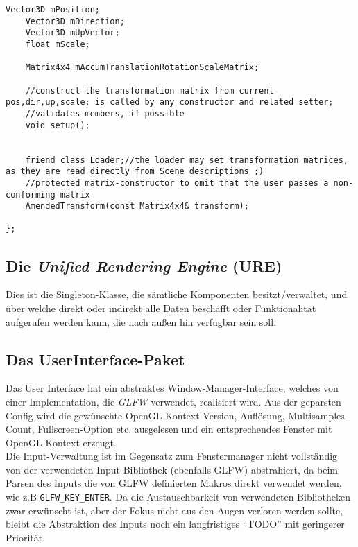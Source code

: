 \begin{lstlisting}[caption={AmenededTransform Klassendefinition, gekürzt},label=listing:AmendedTransformDef]
	Vector3D mPosition;
	Vector3D mDirection;
	Vector3D mUpVector;
	float mScale;
	
	Matrix4x4 mAccumTranslationRotationScaleMatrix;

	//construct the transformation matrix from current pos,dir,up,scale; is called by any constructor and related setter;
	//validates members, if possible
	void setup();


	friend class Loader;//the loader may set transformation matrices, as they are read directly from Scene descriptions ;)
	//protected matrix-constructor to omit that the user passes a non-conforming matrix	
	AmendedTransform(const Matrix4x4& transform);
	
};
 	\end{lstlisting}
 	
 	

    	
    	
    	
\subsection{Die \emph{Unified Rendering Engine} (URE)}
	Dies ist die Singleton-Klasse, die sämtliche Komponenten besitzt/verwaltet, und über welche direkt oder indirekt alle 
	Daten beschafft oder Funktionalität aufgerufen werden kann, die nach außen hin verfügbar sein soll.

\subsection{Das UserInterface-Paket}
	Das User Interface hat ein abstraktes Window-Manager-Interface, welches von einer Implementation, die \emph{GLFW} 	
	verwendet, realisiert wird.
	Aus der geparsten Config wird die gewünschte OpenGL-Kontext-Version, Auflösung, Multisamples-Count, Fullscreen-Option
	etc. ausgelesen und ein entsprechendes Fenster mit OpenGL-Kontext erzeugt.\\

	Die Input-Verwaltung ist im Gegensatz zum Fenstermanager nicht vollständig von der verwendeten Input-Bibliothek 	
	(ebenfalls GLFW) abstrahiert, da beim Parsen des Inputs die von GLFW definierten Makros direkt verwendet werden, 
	 wie z.B \lstinline|GLFW_KEY_ENTER|.
	Da die Austauschbarkeit von verwendeten Bibliotheken zwar erwünscht ist, aber der Fokus nicht aus den Augen 
	verloren werden sollte, bleibt die Abstraktion des Inputs noch ein langfristiges "`TODO"' mit geringerer Priorität.

